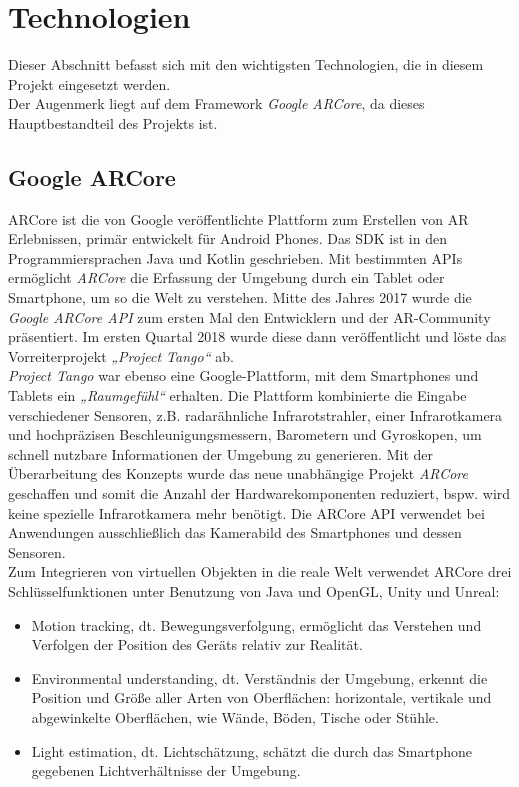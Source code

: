 \section{Technologien}
\label{chap:Technologien}                       %
Dieser Abschnitt befasst sich mit den wichtigsten Technologien, die in diesem Projekt eingesetzt werden. 
\\ 
Der Augenmerk liegt auf dem Framework \textit{Google ARCore}, da dieses Hauptbestandteil des Projekts ist. 
\subsection{Google ARCore}
\label{sec:arcore}
ARCore ist die von Google veröffentlichte Plattform zum Erstellen von \acl{AR} Erlebnissen, primär entwickelt für Android Phones. 
Das \ac{SDK} ist in den Programmiersprachen Java und Kotlin geschrieben. Mit bestimmten \acs{API}s ermöglicht \textit{ARCore} die Erfassung 
der Umgebung durch ein Tablet oder Smartphone, um so die Welt zu verstehen. Mitte des Jahres 2017 
wurde die \textit{Google ARCore API} zum ersten Mal den Entwicklern und der \acs{AR}-Community präsentiert. Im ersten Quartal 2018 wurde 
diese dann veröffentlicht und löste das Vorreiterprojekt \textit{„Project Tango“} ab. \cite{arcoreofficial.2020j}
\\ 
\linebreak 
\textit{Project Tango} war ebenso eine Google-Plattform, mit dem Smartphones und Tablets ein \textit{„Raumgefühl“} erhalten. \cite{projecttango.2016j} 
Die Plattform kombinierte die Eingabe verschiedener Sensoren, z.B. radarähnliche Infrarotstrahler, einer Infrarotkamera und hochpräzisen 
Beschleunigungsmessern, Barometern und Gyroskopen, um schnell nutzbare Informationen der Umgebung zu generieren. Mit der Überarbeitung des 
Konzepts wurde das neue unabhängige Projekt \textit{ARCore} geschaffen und somit die Anzahl der Hardwarekomponenten reduziert, bspw. wird 
keine spezielle Infrarotkamera mehr benötigt. Die ARCore \acs{API} verwendet bei Anwendungen ausschließlich das Kamerabild des Smartphones und 
dessen Sensoren. 
\\ 
\linebreak 
Zum Integrieren von virtuellen Objekten in die reale Welt verwendet ARCore drei Schlüsselfunktionen unter Benutzung von Java und OpenGL, Unity 
und Unreal:
\begin{itemize}
    \item Motion tracking, dt. Bewegungsverfolgung, ermöglicht das Verstehen und Verfolgen der Position des Geräts relativ zur Realität.
    \item Environmental understanding, dt. Verständnis der Umgebung, erkennt die Position und Größe aller Arten von Oberflächen: horizontale, 
    vertikale und abgewinkelte Oberflächen, wie Wände, Böden, Tische oder Stühle.
    \item Light estimation, dt. Lichtschätzung, schätzt die durch das Smartphone gegebenen Lichtverhältnisse der Umgebung. \cite{arcorefundamentals.2018m}
\end{itemize}
